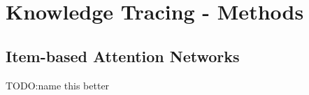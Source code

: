 \chapter{Knowledge Tracing - Methods}

\section{Item-based Attention Networks}
TODO:name this better
